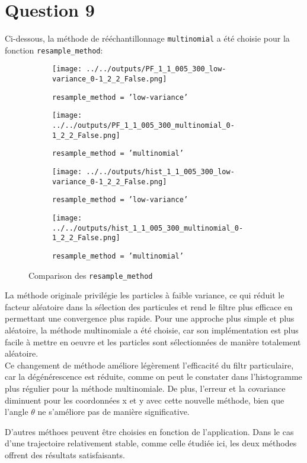 \documentclass[../CSC_5RO12_TA_TP3.tex]{subfiles}
\begin{document}
\section{Question 9}
\noindent Ci-dessous, la méthode de rééchantillonnage \texttt{multinomial} a été choisie pour la fonction \texttt{resample\_method}:
\begin{figure}[H]
    \centering
    \begin{subfigure}[b]{0.475\textwidth}
        \centering
        \texttt{[image: ../../outputs/PF\_1\_1\_005\_300\_low-variance\_0-1\_2\_2\_False.png]}
        \caption{\texttt{resample\_method = 'low-variance'}}
        \label{}
    \end{subfigure}\hfill
    \begin{subfigure}[b]{0.475\textwidth}
        \centering
        \texttt{[image: ../../outputs/PF\_1\_1\_005\_300\_multinomial\_0-1\_2\_2\_False.png]}
        \caption{\texttt{resample\_method = 'multinomial'}}
        \label{}
    \end{subfigure}
    \begin{subfigure}[b]{0.475\textwidth}
        \centering
        \texttt{[image: ../../outputs/hist\_1\_1\_005\_300\_low-variance\_0-1\_2\_2\_False.png]}
        \caption{\texttt{resample\_method = 'low-variance'}}
        \label{}
    \end{subfigure}\hfill
    \begin{subfigure}[b]{0.475\textwidth}
        \centering
        \texttt{[image: ../../outputs/hist\_1\_1\_005\_300\_multinomial\_0-1\_2\_2\_False.png]}
        \caption{\texttt{resample\_method = 'multinomial'}}
        \label{}
    \end{subfigure}
    \caption{Comparison des \texttt{resample\_method}}
    \label{}
\end{figure}
\noindent La méthode originale privilégie les particles à faible variance, ce qui réduit le facteur aléatoire dans la sélection des particules et rend le filtre plus efficace en permettant une convergence plus rapide. Pour une approche plus simple et plus aléatoire, la méthode multinomiale a été choisie, car son implémentation est plus facile à mettre en oeuvre et les particles sont sélectionnées de manière totalement aléatoire.\\

\noindent Ce changement de méthode améliore légèrement l'efficacité du filtr particulaire, car la dégénérescence est réduite, comme on peut le constater dans l'histogramme plus régulier pour la méthode multinomiale. De plus, l'erreur et la covariance diminuent pour les coordonnées x et y avec cette nouvelle méthode, bien que l'angle $\theta$ ne s'améliore pas de manière significative.

\begin{remark}
    D'autres méthoes peuvent être choisies en fonction de l'application. Dans le cas d'une trajectoire relativement stable, comme celle étudiée ici, les deux méthodes offrent des résultats satisfaisants.
\end{remark}
\end{document}

